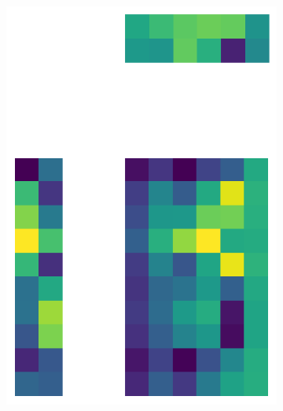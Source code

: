 \documentclass[10pt,twocolumn]{article}
\begin{document}
\begin{figure}[H]
\begin{subfigure}[t]{.15\textwidth}
\includegraphics[scale=.2]{DWGs/semi-structured-matrix-reconstruction-PCs-2.png}
\caption{ }
\end{subfigure}
\begin{subfigure}[t]{.15\textwidth}
\centering

\end{subfigure}
\end{figure}
\end{document}
